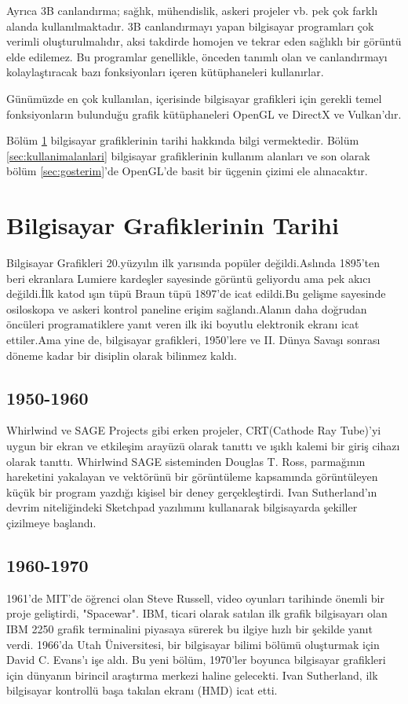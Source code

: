 \documentclass{IEEEtran}
\begin{document}
Ayrıca 3B canlandırma; sağlık, mühendislik, askeri projeler vb. pek çok farklı alanda kullanılmaktadır. 3B canlandırmayı yapan bilgisayar programları çok verimli oluşturulmalıdır, aksi takdirde homojen ve tekrar eden sağlıklı bir görüntü elde edilemez. Bu programlar genellikle, önceden tanımlı olan ve canlandırmayı kolaylaştıracak bazı fonksiyonları içeren kütüphaneleri kullanırlar. 

Günümüzde en çok kullanılan, içerisinde bilgisayar grafikleri için gerekli temel fonksiyonların bulunduğu grafik kütüphaneleri OpenGL ve DirectX ve Vulkan'dır. \cite{wikipedia}

Bölüm \ref{sec:tarihce} bilgisayar grafiklerinin tarihi hakkında bilgi vermektedir. Bölüm \ref{sec:kullanimalanlari} bilgisayar grafiklerinin kullanım alanları ve son olarak bölüm \ref{sec:gosterim}'de OpenGL'de basit bir üçgenin çizimi ele alınacaktır.

\section{Bilgisayar Grafiklerinin Tarihi}
\label{sec:tarihce}
Bilgisayar Grafikleri 20.yüzyılın ilk yarısında popüler değildi.Aslında 1895'ten beri ekranlara Lumiere kardeşler sayesinde görüntü geliyordu ama pek akıcı değildi.İlk katod ışın tüpü Braun tüpü 1897'de icat edildi.Bu gelişme sayesinde osiloskopa ve askeri kontrol paneline erişim sağlandı.Alanın daha doğrudan öncüleri programatiklere yanıt veren ilk iki boyutlu elektronik ekranı icat ettiler.Ama yine de, bilgisayar grafikleri, 1950'lere ve II. Dünya Savaşı sonrası döneme kadar bir disiplin olarak bilinmez kaldı.
\subsection{1950-1960}
Whirlwind ve SAGE Projects gibi erken projeler, CRT(Cathode Ray Tube)'yi uygun bir ekran ve etkileşim arayüzü olarak tanıttı ve ışıklı kalemi bir giriş cihazı olarak tanıttı. Whirlwind SAGE sisteminden Douglas T. Ross, parmağının hareketini yakalayan ve vektörünü bir görüntüleme kapsamında görüntüleyen küçük bir program yazdığı kişisel bir deney gerçekleştirdi.  Ivan Sutherland'ın devrim niteliğindeki Sketchpad yazılımını kullanarak bilgisayarda şekiller çizilmeye başlandı. \cite{crazyprogrammer}
\subsection{1960-1970}
1961'de MIT'de öğrenci olan Steve Russell, video oyunları tarihinde önemli bir proje geliştirdi, "Spacewar". IBM, ticari olarak satılan ilk grafik bilgisayarı olan IBM 2250 grafik terminalini piyasaya sürerek bu ilgiye hızlı bir şekilde yanıt verdi. 1966'da Utah Üniversitesi, bir bilgisayar bilimi bölümü oluşturmak için David C. Evans'ı işe aldı. Bu yeni bölüm, 1970'ler boyunca bilgisayar grafikleri için dünyanın birincil araştırma merkezi haline gelecekti. Ivan Sutherland, ilk bilgisayar kontrollü başa takılan ekranı (HMD) icat etti.
\end{document}
